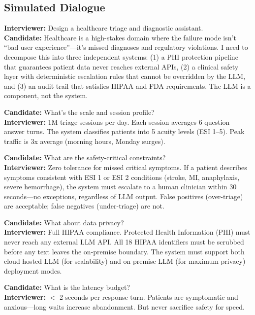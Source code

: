 \subsection*{Simulated Dialogue}
\textbf{Interviewer:} Design a healthcare triage and diagnostic assistant.\\
\textbf{Candidate:} Healthcare is a high-stakes domain where the failure mode isn't ``bad user experience''---it's missed diagnoses and regulatory violations. I need to decompose this into three independent systems: (1) a PHI protection pipeline that guarantees patient data never reaches external APIs, (2) a clinical safety layer with deterministic escalation rules that cannot be overridden by the LLM, and (3) an audit trail that satisfies HIPAA and FDA requirements. The LLM is a component, not the system.

\textbf{Candidate:} What's the scale and session profile?\\
\textbf{Interviewer:} 1M triage sessions per day. Each session averages 6 question-answer turns. The system classifies patients into 5 acuity levels (ESI 1--5). Peak traffic is 3x average (morning hours, Monday surges).

\textbf{Candidate:} What are the safety-critical constraints?\\
\textbf{Interviewer:} Zero tolerance for missed critical symptoms. If a patient describes symptoms consistent with ESI 1 or ESI 2 conditions (stroke, MI, anaphylaxis, severe hemorrhage), the system must escalate to a human clinician within 30 seconds---no exceptions, regardless of LLM output. False positives (over-triage) are acceptable; false negatives (under-triage) are not.

\textbf{Candidate:} What about data privacy?\\
\textbf{Interviewer:} Full HIPAA compliance. Protected Health Information (PHI) must never reach any external LLM API. All 18 HIPAA identifiers must be scrubbed before any text leaves the on-premise boundary. The system must support both cloud-hosted LLM (for scalability) and on-premise LLM (for maximum privacy) deployment modes.

\textbf{Candidate:} What is the latency budget?\\
\textbf{Interviewer:} $<$ 2 seconds per response turn. Patients are symptomatic and anxious---long waits increase abandonment. But never sacrifice safety for speed.

